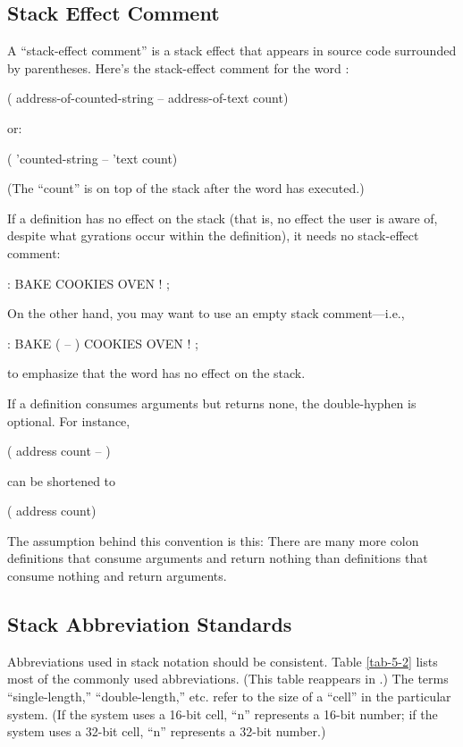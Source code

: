 \subsection{Stack Effect Comment}

A ``stack-effect comment'' is a stack effect that appears in source
code surrounded by parentheses.  Here's the stack-effect comment for
the word :
\begin{Code}
( address-of-counted-string -- address-of-text count)
\end{Code}
or:
\begin{Code}
( 'counted-string -- 'text count)
\end{Code}
(The ``count'' is on top of the stack after the word has executed.)

If a definition has no effect on the stack (that is, no effect the
user is aware of, despite what gyrations occur within the definition),
it needs no stack-effect comment:
\begin{Code}
: BAKE   COOKIES OVEN ! ;
\end{Code}
On the other hand, you may want to use an empty stack comment---i.e.,
\begin{Code}
: BAKE   ( -- )  COOKIES OVEN ! ;
\end{Code}
to emphasize that the word has no effect on the stack.

If a definition consumes arguments but returns none, the double-hyphen
is optional.  For instance,
\begin{Code}
( address count -- )
\end{Code}
can be shortened to
\begin{Code}
( address count)
\end{Code}
The assumption behind this convention is this: There are many more
colon definitions that consume arguments and return nothing than
definitions that consume nothing and return arguments.

\subsection{Stack Abbreviation Standards}

Abbreviations used in stack notation should be consistent. Table
\ref{tab-5-2} lists most of the commonly used abbreviations.  (This
table reappears in .) The terms ``single-length,''
``double-length,'' etc. refer to the size of a ``cell'' in the
particular \Forth{} system.  (If the system uses a 16-bit cell, ``n''
represents a 16-bit number; if the system uses a 32-bit cell, ``n''
represents a 32-bit number.)

